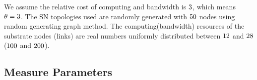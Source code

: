 We assume the relative cost of computing and bandwidth is $3$\cite{armbrust2009above,yu2010survivable}, which means $\theta=3$. The SN topologies used are randomly generated with $50$ nodes using random generating graph method. The computing(bandwidth) resources of the substrate nodes (links) are real numbers uniformly distributed between $12$ and $28$ ($100$ and $200$).



\subsection{Measure Parameters}


